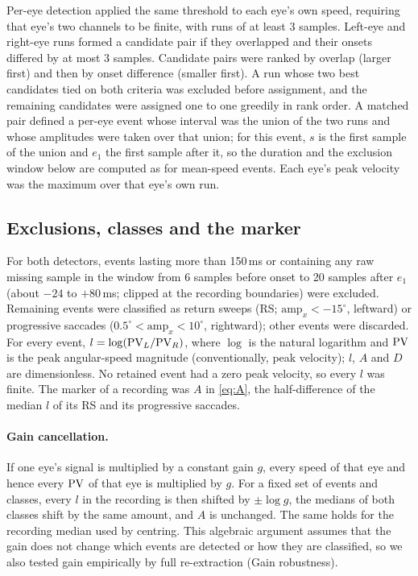 Per-eye detection applied the same threshold to each eye's own speed, requiring that eye's two channels to be finite, with runs of at least 3 samples. Left-eye and right-eye runs formed a candidate pair if they overlapped and their onsets differed by at most 3 samples. Candidate pairs were ranked by overlap (larger first) and then by onset difference (smaller first). A run whose two best candidates tied on both criteria was excluded before assignment, and the remaining candidates were assigned one to one greedily in rank order. A matched pair defined a per-eye event whose interval was the union of the two runs and whose amplitudes were taken over that union; for this event, $s$ is the first sample of the union and $e_1$ the first sample after it, so the duration and the exclusion window below are computed as for mean-speed events. Each eye's peak velocity was the maximum over that eye's own run.

\subsection{Exclusions, classes and the marker}

For both detectors, events lasting more than 150\,ms or containing any raw missing sample in the window from 6 samples before onset to 20 samples after $e_1$ (about $-24$ to $+80$\,ms; clipped at the recording boundaries) were excluded. Remaining events were classified as return sweeps (RS; $\mathrm{amp}_x < -15^\circ$, leftward) or progressive saccades ($0.5^\circ < \mathrm{amp}_x < 10^\circ$, rightward); other events were discarded. For every event, $l = \log(\mathrm{PV}_L / \mathrm{PV}_R)$, where $\log$ is the natural logarithm and $\mathrm{PV}$ is the peak angular-speed magnitude (conventionally, peak velocity); $l$, $A$ and $D$ are dimensionless. No retained event had a zero peak velocity, so every $l$ was finite. The marker of a recording was $A$ in \cref{eq:A}, the half-difference of the median $l$ of its RS and its progressive saccades.

\paragraph{Gain cancellation.} If one eye's signal is multiplied by a constant gain $g$, every speed of that eye and hence every $\mathrm{PV}$ of that eye is multiplied by $g$. For a fixed set of events and classes, every $l$ in the recording is then shifted by $\pm\log g$, the medians of both classes shift by the same amount, and $A$ is unchanged. The same holds for the recording median used by centring. This algebraic argument assumes that the gain does not change which events are detected or how they are classified, so we also tested gain empirically by full re-extraction (Gain robustness).

